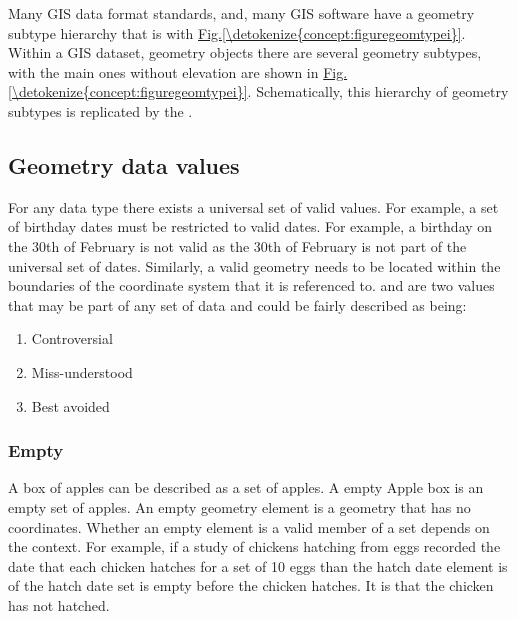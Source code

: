 \documentclass[letterpaper,11pt,english]{sphinxmanual}
\begin{document}
Many GIS data format standards, and, many GIS software have a geometry subtype hierarchy that is  with \hyperref[\detokenize{concept:figuregeomtypei}]{Fig.\@ \ref{\detokenize{concept:figuregeomtypei}}}.  Within a GIS dataset, geometry objects there are several geometry subtypes, with the main ones without elevation are shown in \hyperref[\detokenize{concept:figuregeomtypei}]{Fig.\@ \ref{\detokenize{concept:figuregeomtypei}}}.  Schematically, this hierarchy of geometry subtypes is replicated by the  .


\subsection{Geometry data values}
\label{\detokenize{concept:geometry-data-values}}
For any data type there exists a universal set of valid values.  For example, a set of birthday dates must be restricted to valid dates.  For example, a birthday on the 30th of February is not valid as the 30th of February is not part of the universal set of dates.  Similarly, a valid geometry needs to be located within the boundaries of the coordinate system that it is referenced to.   and  are two values that may be part of any set of data and could be fairly described as being:
\begin{enumerate}
\def\theenumi{\arabic{enumi}}
\def\labelenumi{\theenumi .}
\makeatletter\def\p@enumii{\p@enumi \theenumi .}\makeatother
\item {} 
Controversial

\item {} 
Miss-understood

\item {} 
Best avoided

\end{enumerate}


\subsubsection{Empty}
\label{\detokenize{concept:empty}}
A box of apples can be described as a set of apples.  A empty Apple box is an empty set of apples.  An empty geometry element is a geometry that has no coordinates.  Whether an empty element is a valid member of a set depends on the context.  For example, if a study of chickens hatching from eggs recorded the date that each chicken hatches for a set of 10 eggs than the hatch date element is of the hatch date set is empty before the chicken hatches.  It is  that the chicken has not hatched.
\end{document}

